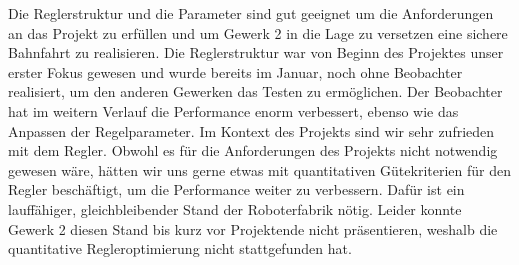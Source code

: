 Die Reglerstruktur und die Parameter sind gut geeignet um die Anforderungen an das Projekt zu erfüllen und um Gewerk 2 in die Lage zu versetzen eine sichere Bahnfahrt zu realisieren. Die Reglerstruktur war von Beginn des Projektes unser erster Fokus gewesen und wurde bereits im Januar, noch ohne Beobachter realisiert, um den anderen Gewerken das Testen zu ermöglichen. Der Beobachter hat im weitern Verlauf die Performance enorm verbessert, ebenso wie das Anpassen der Regelparameter. Im Kontext des Projekts sind wir sehr zufrieden mit dem Regler. Obwohl es für die Anforderungen des Projekts nicht notwendig gewesen wäre, hätten wir uns gerne etwas mit quantitativen Gütekriterien für den Regler beschäftigt, um die Performance weiter zu verbessern. Dafür ist ein lauffähiger, gleichbleibender Stand der Roboterfabrik nötig. Leider konnte Gewerk 2 diesen Stand bis kurz vor Projektende nicht präsentieren, weshalb die quantitative Regleroptimierung nicht stattgefunden hat.
